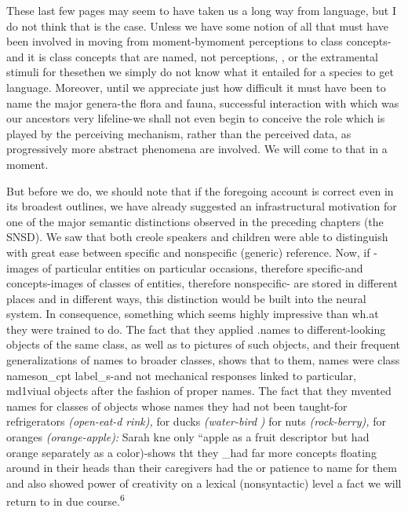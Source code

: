 These last few pages may seem to have taken us a long way from language, but I do not think that is the case. Unless we have some
notion of all that must have been involved in moving from moment-by\-moment perceptions to class concepts-and it is class concepts that are named, not perceptions, , or the extramental stimuli for these\-then we simply do not know what it entailed for a species to get language. Moreover, until we appreciate just how difficult it must have been to name the major genera-the flora and fauna, successful inter\-action with which was our ancestors very lifeline-we shall not even begin to conceive the role which is played by the perceiving mechan\-ism, rather than the perceived data, as progressively more abstract phenomena are involved. We will come to that in a moment.

But before we do, we should note that if the foregoing account
is correct even in its broadest outlines, we have already suggested an infrastructural motivation for one of the major semantic distinctions observed in the preceding chapters (the SNSD). We saw that both creole speakers and children were able to distinguish with great ease between specific and nonspecific (generic) reference. Now, if -images of particular entities on particular occasions, therefore specific-and concepts-images of classes of entities, therefore nonspecific- are stored in different places and in different ways, this distinction would be built into the neural system. In consequence, something which seems highly
impressive than wh.at they were trained to do. The fact that they applied .names to different-looking objects of the same class, as well as to pictures of such objects, and their frequent generalizations of names to broader classes, shows that to them, names were class names\-on\_cpt label\_s-and not mechanical responses linked to particular, md1viual objects after the fashion of proper names. The fact that they mvented names for classes of objects whose names they had not been taught-for refrigerators \textit{(open-eat-d} \textit{rink),} for ducks \textit{(water-bird} \textit{)} for  nuts \textit{(roc}\textit{k}\textit{{}-berr}\textit{y}\textit{), }for oranges \textit{(orange-apple):} Sarah kne only ``apple as a fruit descriptor but had orange separately as a co\-lor)-shows tht they \_had far more concepts floating around in their heads than their caregivers had the  or patience to name for them and also showed power of creativity on a lexical (nonsyntactic) level a fact we will return to in due course.\textsuperscript{6 }


